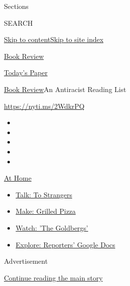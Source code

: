 Sections

SEARCH

\protect\hyperlink{site-content}{Skip to
content}\protect\hyperlink{site-index}{Skip to site index}

\href{https://www.nytimes.com/section/books/review}{Book Review}

\href{https://myaccount.nytimes.com/auth/login?response_type=cookie\&client_id=vi}{}

\href{https://www.nytimes.com/section/todayspaper}{Today's Paper}

\href{/section/books/review}{Book Review}\textbar{}An Antiracist Reading
List

\url{https://nyti.ms/2WdkrPQ}

\begin{itemize}
\item
\item
\item
\item
\item
\end{itemize}

\href{https://www.nytimes.com/spotlight/at-home?action=click\&pgtype=Article\&state=default\&region=TOP_BANNER\&context=at_home_menu}{At
Home}

\begin{itemize}
\tightlist
\item
  \href{https://www.nytimes.com/2020/08/03/well/family/the-benefits-of-talking-to-strangers.html?action=click\&pgtype=Article\&state=default\&region=TOP_BANNER\&context=at_home_menu}{Talk:
  To Strangers}
\item
  \href{https://www.nytimes.com/2020/08/01/at-home/coronavirus-make-pizza-on-a-grill.html?action=click\&pgtype=Article\&state=default\&region=TOP_BANNER\&context=at_home_menu}{Make:
  Grilled Pizza}
\item
  \href{https://www.nytimes.com/2020/07/31/arts/television/goldbergs-abc-stream.html?action=click\&pgtype=Article\&state=default\&region=TOP_BANNER\&context=at_home_menu}{Watch:
  'The Goldbergs'}
\item
  \href{https://www.nytimes.com/interactive/2020/at-home/even-more-reporters-editors-diaries-lists-recommendations.html?action=click\&pgtype=Article\&state=default\&region=TOP_BANNER\&context=at_home_menu}{Explore:
  Reporters' Google Docs}
\end{itemize}

Advertisement

\protect\hyperlink{after-top}{Continue reading the main story}

